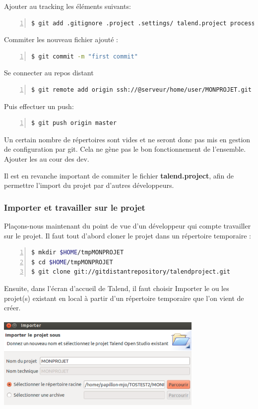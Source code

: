 \documentclass[10pt,oneside,a4paper]{book} %
\begin{document}
Ajouter au tracking les éléments suivants:
\begin{lstlisting}[language=bash,numbers=left,numberstyle=\tiny,backgroundcolor=\color{Zgris}]
$ git add .gitignore .project .settings/ talend.project process/
\end{lstlisting}

Commiter les nouveau fichier ajouté :
\begin{lstlisting}[language=bash,numbers=left,numberstyle=\tiny,backgroundcolor=\color{Zgris}]
$ git commit -m "first commit"
\end{lstlisting}

Se connecter au repos distant
\begin{lstlisting}[language=bash,numbers=left,numberstyle=\tiny,backgroundcolor=\color{Zgris}]
$ git remote add origin ssh://@serveur/home/user/MONPROJET.git
\end{lstlisting}

Puis effectuer un push:
\begin{lstlisting}[language=bash,numbers=left,numberstyle=\tiny,backgroundcolor=\color{Zgris}]
$ git push origin master
\end{lstlisting}

Un certain nombre de répertoires sont vides et ne seront donc pas mis en gestion de configuration par git. Cela ne gène pas le bon fonctionnement de l’ensemble. Ajouter les au cour des dev.

Il est en revanche important de commiter le fichier \textbf{talend.project}, afin de permettre l’import du projet par d’autres développeurs.

\subsubsection{Importer et travailler sur le projet}

Plaçons-nous maintenant du point de vue d’un développeur qui compte travailler sur le projet. Il faut tout d’abord cloner le projet dans un répertoire temporaire :

\begin{lstlisting}[language=bash,numbers=left,numberstyle=\tiny,backgroundcolor=\color{Zgris}]
$ mkdir $HOME/tmpMONPROJET
$ cd $HOME/tmpMONPROJET
$ git clone git://gitdistantrepository/talendproject.git
\end{lstlisting}

Ensuite, dans l’écran d’accueil de Talend, il faut choisir Importer le ou les projet(s) existant en local à partir d’un répertoire temporaire que l’on vient de créer.\\\\
\includegraphics[origin=l,width=10cm]{image/image3.png}
\end{document}

